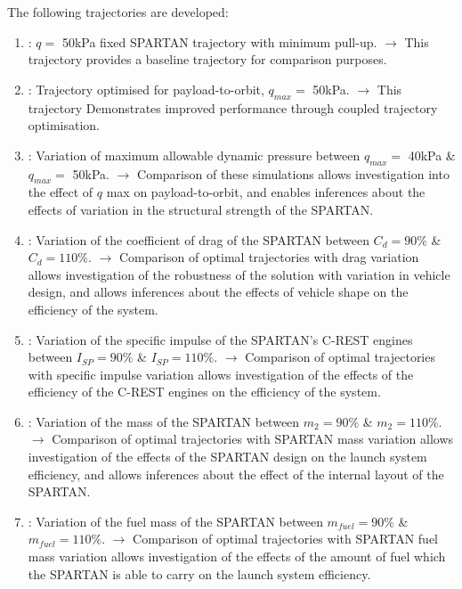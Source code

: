 The following trajectories are developed: 
\begin{enumerate}
	\item: $q = $ 50kPa fixed SPARTAN trajectory with minimum pull-up. \newline$\rightarrow$ This trajectory provides a baseline trajectory for comparison purposes.
	\item: Trajectory optimised for payload-to-orbit, $q_{max} = $ 50kPa. \newline$\rightarrow$ This trajectory Demonstrates improved performance through coupled trajectory optimisation.
	\item: Variation of maximum allowable dynamic pressure between $q_{max} = $ 40kPa \& $q_{max} = $ 50kPa. 
	\newline$\rightarrow$ Comparison of these simulations allows investigation into the effect of $q$ max on payload-to-orbit, and enables inferences about the effects of variation in the structural strength of the SPARTAN.
	\item: Variation of the coefficient of drag of the SPARTAN between $C_d = 90\%$ \& $C_d = 110\%$. 
	\newline$\rightarrow$ Comparison of optimal trajectories with drag variation allows investigation of the robustness of the solution with variation in vehicle design, and allows inferences about the effects of vehicle shape on the efficiency of the system. 
	\item: Variation of the specific impulse of the SPARTAN's C-REST engines between $I_{SP} = 90\%$ \& $I_{SP} = 110\%$. 
	\newline$\rightarrow$ Comparison of optimal trajectories with specific impulse variation allows investigation of the effects of the efficiency of the C-REST engines on the efficiency of the system. 
	\item: Variation of the mass of the SPARTAN between $m_2 = 90\%$ \& $m_2 = 110\%$. 
	\newline$\rightarrow$ Comparison of optimal trajectories with SPARTAN mass variation allows investigation of the effects of the SPARTAN design on the launch system efficiency, and allows inferences about the effect of the internal layout of the SPARTAN. 
	\item: Variation of the fuel mass of the SPARTAN between $m_{fuel} = 90\%$ \& $m_{fuel} = 110\%$. 
	\newline$\rightarrow$ Comparison of optimal trajectories with SPARTAN fuel mass variation allows investigation of the effects of the amount of fuel which the SPARTAN is able to carry on the launch system efficiency. 

\end{enumerate}
